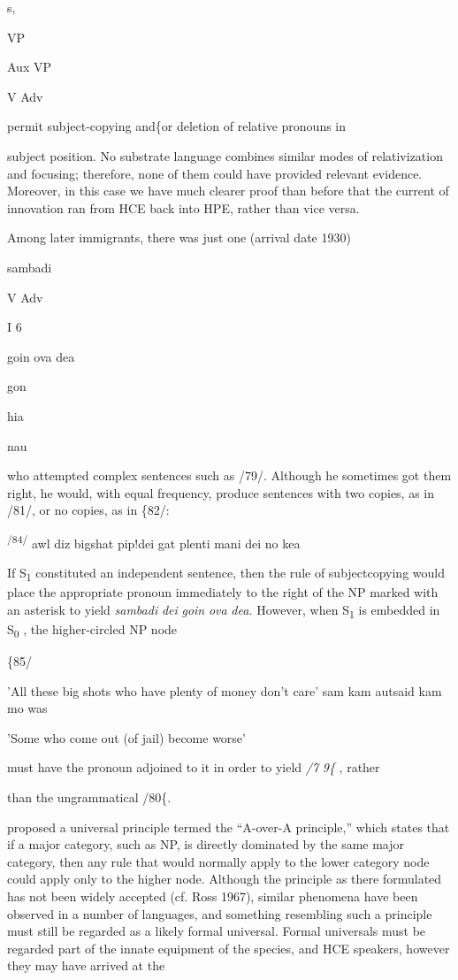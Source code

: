 s,

VP

Aux VP

V Adv

permit subject-copying and\{or deletion of relative pronouns in

subject position. No substrate language combines similar modes of relativization and focusing; therefore, none of them could have pro\-vided relevant evidence. Moreover, in this case we have much clearer proof than before that the current of innovation ran from HCE back into HPE, rather than vice versa.

Among later immigrants, there was just one (arrival date 1930)

sambadi

V Adv

I 6

goin ova dea

gon

hia

nau

who attempted complex sentences such as /79/. Although he some\-times got them right, he would, with equal frequency, produce sen\-tences with two copies, as in /81/, or no copies, as in \{82/:

\textsuperscript{/84/ }awl diz bigshat pip!dei gat plenti mani dei no kea

If S\textsubscript{1}\textsubscript{ }constituted an independent sentence, then the rule of subject\-copying would place the appropriate pronoun immediately to the right of the NP marked with an asterisk to yield \textit{sambadi} \textit{dei} \textit{goin} \textit{ova} \textit{dea.} However, when S\textsubscript{1}\textsubscript{ }is embedded in S\textsubscript{0}\textsubscript{ }, the higher-circled NP node

\{85/

'All these big shots who have plenty of money don't care' sam kam autsaid kam mo was

'Some who come out (of jail) become worse'

must have the pronoun adjoined to it in order to yield \textit{/7} \textit{9\{} , rather

than the ungrammatical /80\{.

\citet{Chomsky1964} proposed a universal principle termed the ``A-over-A principle,'' which states that if a major category, such as NP, is directly dominated by the same major category, then any rule that would normally apply to the lower category node could apply only to the higher node. Although the principle as there formulated has not been widely accepted (cf. Ross 1967), similar phenomena have been observed in a number of languages, and something resembling such a principle must still be regarded as a likely formal universal. Formal universals must be regarded part of the innate equipment of the species, and HCE speakers, however they may have arrived at the


